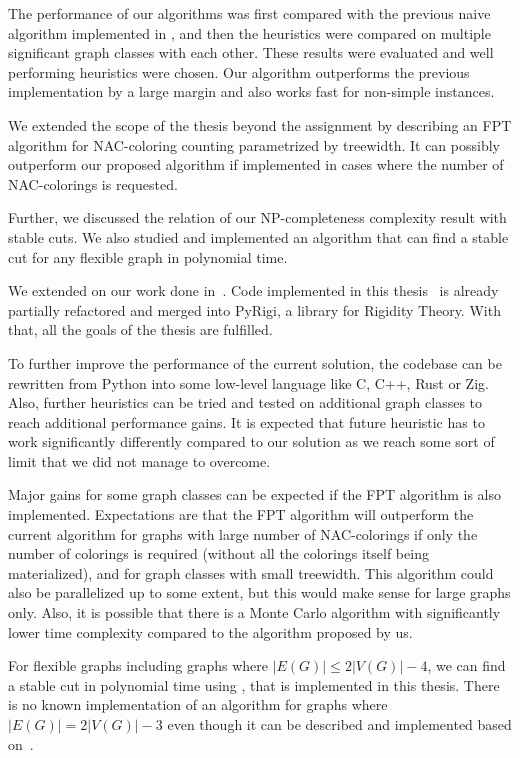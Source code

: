 The performance of our algorithms was
first compared with the previous naive algorithm implemented in \flexrilog{},
and then the heuristics were compared on multiple significant graph classes
with each other.
%
These results were evaluated and well performing heuristics were chosen.
Our algorithm outperforms the previous implementation by a large margin
and also works fast for non-simple instances.

We extended the scope of the thesis beyond the assignment by
describing an FPT algorithm for NAC-coloring counting
parametrized by treewidth.
It can possibly outperform our proposed algorithm if implemented
in cases where the number of NAC-colorings is requested.

Further, we discussed the relation of our NP-completeness complexity result
with stable cuts.
We also studied and implemented an algorithm that can find
a stable cut for any flexible graph in polynomial time.

We extended on our work done in~\cite{my_paper}.
Code implemented in this thesis~\cite{my_code} is already partially
refactored and merged into PyRigi, a library for Rigidity Theory.
%
With that, all the goals of the thesis are fulfilled.


To further improve the performance of the current solution, the codebase
can be rewritten from Python into some low-level language like C, C++, Rust or Zig.
Also, further heuristics can be tried
and tested on additional graph classes
to reach additional performance gains.
It is expected that future heuristic has to work significantly differently
compared to our solution as we reach some sort of limit
that we did not manage to overcome.

Major gains for some graph classes
can be expected if the FPT algorithm is also implemented.
Expectations are that the FPT algorithm will outperform the current algorithm
for graphs with large number of NAC-colorings if only the number of colorings
is required (without all the colorings itself being materialized),
and for graph classes with small treewidth.
This algorithm could also be parallelized up to some extent,
but this would make sense for large graphs only.
%
Also, it is possible that there is a Monte Carlo algorithm with significantly
lower time complexity compared to the algorithm proposed by us.

For flexible graphs including graphs where \( |E(G)| \le 2|V(G)| - 4 \),
we can find a stable cut in polynomial time using ,
that is implemented in this thesis.
There is no known implementation of an algorithm
for graphs where \( |E(G)| = 2|V(G)| - 3 \)
even though it can be described and implemented
based on~\cite{stable_cuts_2v_3,stable_cuts_2v_3_revisit}.


